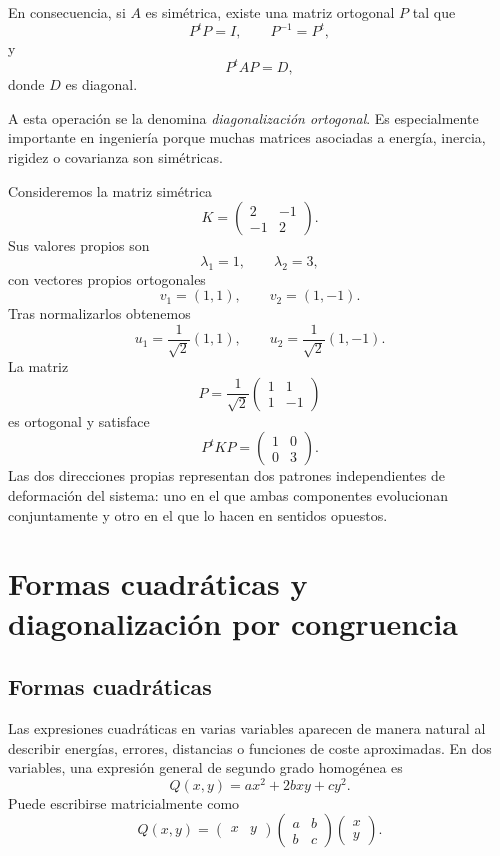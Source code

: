 En consecuencia, si $A$ es simétrica, existe una matriz ortogonal $P$ tal que
\[
P^tP=I,
\qquad
P^{-1}=P^t,
\]
y
\[
\boxed{P^tAP=D,}
\]
donde $D$ es diagonal.

A esta operación se la denomina \emph{diagonalización ortogonal}. Es especialmente importante en ingeniería porque muchas matrices asociadas a energía, inercia, rigidez o covarianza son simétricas.

\begin{example}
Consideremos la matriz simétrica
\[
K=\begin{pmatrix}
2&-1\\
-1&2
\end{pmatrix}.
\]
Sus valores propios son
\[
\lambda_1=1,
\qquad
\lambda_2=3,
\]
con vectores propios ortogonales
\[
v_1=(1,1),
\qquad
v_2=(1,-1).
\]
Tras normalizarlos obtenemos
\[
u_1=\frac1{\sqrt2}(1,1),
\qquad
u_2=\frac1{\sqrt2}(1,-1).
\]
La matriz
\[
P=\frac1{\sqrt2}
\begin{pmatrix}
1&1\\
1&-1
\end{pmatrix}
\]
es ortogonal y satisface
\[
P^tKP=\begin{pmatrix}1&0\\0&3\end{pmatrix}.
\]
Las dos direcciones propias representan dos patrones independientes de deformación del sistema: uno en el que ambas componentes evolucionan conjuntamente y otro en el que lo hacen en sentidos opuestos.
\end{example}

\section{Formas cuadráticas y diagonalización por congruencia}
\label{sec:formas-cuadraticas}

\subsection{Formas cuadráticas}

Las expresiones cuadráticas en varias variables aparecen de manera natural al describir energías, errores, distancias o funciones de coste aproximadas. En dos variables, una expresión general de segundo grado homogénea es
\[
Q(x,y)=ax^2+2bxy+cy^2.
\]
Puede escribirse matricialmente como
\[
Q(x,y)=
\begin{pmatrix}x&y\end{pmatrix}
\begin{pmatrix}a&b\\b&c\end{pmatrix}
\begin{pmatrix}x\\y\end{pmatrix}.
\]

